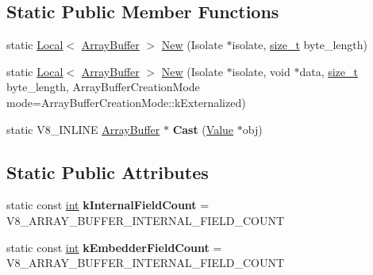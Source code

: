 \subsection*{Static Public Member Functions}
\begin{DoxyCompactItemize}
\item 
static \mbox{\hyperlink{classv8_1_1Local}{Local}}$<$ \mbox{\hyperlink{classv8_1_1ArrayBuffer}{Array\+Buffer}} $>$ \mbox{\hyperlink{classv8_1_1ArrayBuffer_a28e84424cddbe397f3ee3d920189bc04}{New}} (Isolate $\ast$isolate, \mbox{\hyperlink{classsize__t}{size\+\_\+t}} byte\+\_\+length)
\item 
static \mbox{\hyperlink{classv8_1_1Local}{Local}}$<$ \mbox{\hyperlink{classv8_1_1ArrayBuffer}{Array\+Buffer}} $>$ \mbox{\hyperlink{classv8_1_1ArrayBuffer_a550a2293412cd72de8411354987bb31e}{New}} (Isolate $\ast$isolate, void $\ast$data, \mbox{\hyperlink{classsize__t}{size\+\_\+t}} byte\+\_\+length, Array\+Buffer\+Creation\+Mode mode=Array\+Buffer\+Creation\+Mode\+::k\+Externalized)
\item 
\mbox{\label{classv8_1_1ArrayBuffer_a4b0a703ae34217507a8ebc9cabf7336a}} 
static V8\+\_\+\+I\+N\+L\+I\+NE \mbox{\hyperlink{classv8_1_1ArrayBuffer}{Array\+Buffer}} $\ast$ {\bfseries Cast} (\mbox{\hyperlink{classv8_1_1Value}{Value}} $\ast$obj)
\end{DoxyCompactItemize}
\subsection*{Static Public Attributes}
\begin{DoxyCompactItemize}
\item 
\mbox{\label{classv8_1_1ArrayBuffer_af49000a2ea120e49da846ef02a42ac69}} 
static const \mbox{\hyperlink{classint}{int}} {\bfseries k\+Internal\+Field\+Count} = V8\+\_\+\+A\+R\+R\+A\+Y\+\_\+\+B\+U\+F\+F\+E\+R\+\_\+\+I\+N\+T\+E\+R\+N\+A\+L\+\_\+\+F\+I\+E\+L\+D\+\_\+\+C\+O\+U\+NT
\item 
\mbox{\label{classv8_1_1ArrayBuffer_ae383ba945bf84433c8cd3de5d3d56345}} 
static const \mbox{\hyperlink{classint}{int}} {\bfseries k\+Embedder\+Field\+Count} = V8\+\_\+\+A\+R\+R\+A\+Y\+\_\+\+B\+U\+F\+F\+E\+R\+\_\+\+I\+N\+T\+E\+R\+N\+A\+L\+\_\+\+F\+I\+E\+L\+D\+\_\+\+C\+O\+U\+NT
\end{DoxyCompactItemize}


